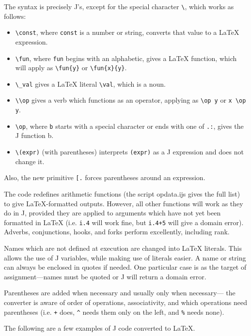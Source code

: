 \documentclass{article}
\begin{document}
The syntax is precisely J's, except for the special character
\lstinline`\`, which works as follows:
\begin{itemize}
  \item \lstinline`\const`, where \lstinline`const` is a number or string,
    converts that value to a LaTeX expression.
  \item \lstinline`\fun`, where \lstinline`fun` begins with an alphabetic,
    gives a LaTeX function, which will apply as \lstinline`\fun{y}`
    or \lstinline`\fun{x}{y}`.
  \item \lstinline`\_val` gives a LaTeX literal \lstinline`\val`, which is a noun.
  \item \lstinline`\\op` gives a verb which functions as an operator,
    applying as \lstinline`\op y` or \lstinline`x \op y`.
  \item \lstinline`\op`, where \lstinline`b` starts with a special character or
    ends with one of \lstinline`.:`, gives the J function b.
  \item \lstinline`\(expr)` (with parentheses) interprets \lstinline`(expr)`
    as a J expression and does not change it.
\end{itemize}

Also, the new primitive \lstinline`[.` forces parentheses around an expression.

The code redefines arithmetic functions (the script opdata.ijs gives the
full list) to give LaTeX-formatted outputs.
However, all other functions will work as they do in J, provided they are
applied to arguments which have not yet been formatted in LaTeX
(i.e. \lstinline`i.4` will work fine, but \lstinline`i.4+5` will give a domain
error).
Adverbs, conjunctions, hooks, and forks perform excellently, including
rank.

Names which are not defined at execution are changed into LaTeX literals.
This allows the use of J variables, while making use of literals easier. 
A name or string can always be enclosed in quotes if needed.
One particular case is as the target of assignment---names must be quoted
or J will return a domain error.

Parentheses are added when necessary and usually only when necessary---
the converter is aware of order of operations, associativity, and which
operations need parentheses (i.e. \lstinline`+` does, \lstinline`^` needs them
only on the left, and \lstinline`%` needs none).

The following are a few examples of J code converted to LaTeX.
\end{document}
